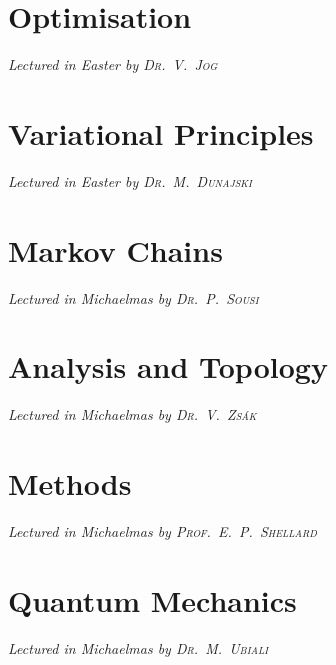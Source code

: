 \newcommand{\yearnumber}{IB}


\chapter[Optimisation \\ \textnormal{\emph{Lectured in Easter \oldstylenums{2021} by \textsc{Dr.\ V.\ Jog}}}]{Optimisation}
\emph{\Large Lectured in Easter  by \textsc{Dr.\ V.\ Jog}}


\chapter[Variational Principles \\ \textnormal{\emph{Lectured in Easter \oldstylenums{2021} by \textsc{Dr.\ M.\ Dunajski}}}]{Variational Principles}
\emph{\Large Lectured in Easter  by \textsc{Dr.\ M.\ Dunajski}}


\chapter[Markov Chains \\ \textnormal{\emph{Lectured in Michaelmas \oldstylenums{2021} by \textsc{Dr.\ P.\ Sousi}}}]{Markov Chains}
\emph{\Large Lectured in Michaelmas  by \textsc{Dr.\ P.\ Sousi}}


\chapter[Analysis and Topology \\ \textnormal{\emph{Lectured in Michaelmas \oldstylenums{2021} by \textsc{Dr.\ V.\ Zs\'ak}}}]{Analysis and Topology}
\emph{\Large Lectured in Michaelmas  by \textsc{Dr.\ V.\ Zs\'ak}}


\chapter[Methods \\ \textnormal{\emph{Lectured in Michaelmas \oldstylenums{2021} by \textsc{Prof.\ E.\ P.\ Shellard}}}]{Methods}
\emph{\Large Lectured in Michaelmas  by \textsc{Prof.\ E.\ P.\ Shellard}}


\chapter[Quantum Mechanics \\ \textnormal{\emph{Lectured in Michaelmas \oldstylenums{2021} by \textsc{Dr.\ M.\ Ubiali}}}]{Quantum Mechanics}
\emph{\Large Lectured in Michaelmas  by \textsc{Dr.\ M.\ Ubiali}}



